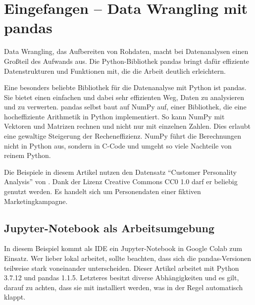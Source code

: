 %
%
%
%




\chapter{Eingefangen -- Data Wrangling mit pandas}

Data Wrangling, das Aufbereiten von Rohdaten, macht bei Datenanalysen einen Großteil des Aufwands aus. Die Python-Bibliothek pandas bringt dafür effiziente Datenstrukturen und Funktionen mit, die die Arbeit deutlich erleichtern.

Eine besonders beliebte Bibliothek für die Datenanalyse mit Python ist pandas. Sie bietet einen einfachen und dabei sehr effizienten Weg, Daten zu analysieren und zu verwerten. pandas selbst baut auf NumPy auf, einer Bibliothek, die eine hocheffiziente Arithmetik in Python implementiert. So kann NumPy mit Vektoren und Matrizen rechnen und nicht nur mit einzelnen Zahlen. Dies erlaubt eine gewaltige Steigerung der Recheneffizienz. NumPy führt die Berechnungen nicht in Python aus, sondern in C-Code und umgeht so viele Nachteile von reinem Python.

Die Beispiele in diesem Artikel nutzen den Datensatz ``Customer Personality Analysis'' von . Dank der Lizenz Creative Commons CC0 1.0 darf er beliebig genutzt werden. Es handelt sich um Personendaten einer fiktiven Marketingkampagne.

\section{Jupyter-Notebook als Arbeitsumgebung}

In diesem Beispiel kommt als IDE ein Jupyter-Notebook in Google Colab zum Einsatz. Wer lieber lokal arbeitet, sollte beachten, dass sich die pandas-Versionen teilweise stark voneinander unterscheiden. Dieser Artikel arbeitet mit Python 3.7.12 und pandas 1.1.5. Letzteres besitzt diverse Abhängigkeiten und es gilt, darauf zu achten, dass sie mit installiert werden, was in der Regel automatisch klappt.

